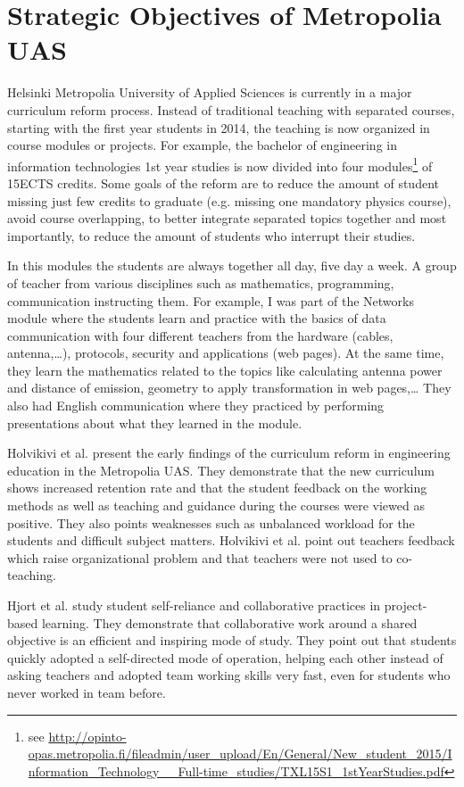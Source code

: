 \section{Strategic Objectives of Metropolia UAS}

Helsinki Metropolia University of Applied Sciences is currently in a major curriculum reform process. 
Instead of traditional teaching with separated courses, starting with the first year students in 2014, the teaching is now organized in course modules or projects. 
For example, the bachelor of engineering in information technologies 1st year studies is now divided into four modules\footnote{see \url{http://opinto-opas.metropolia.fi/fileadmin/user_upload/En/General/New_student_2015/Information_Technology__Full-time_studies/TXL15S1_1stYearStudies.pdf}} of 15ECTS credits. 
Some goals of the reform are to reduce the amount of student missing just few credits to graduate (e.g. missing one mandatory physics course), avoid course overlapping, to better integrate separated topics together and most importantly, to reduce the amount of students who interrupt their studies.

In this modules the students are always together all day, five day a week. A group of teacher from various disciplines such as mathematics, programming, communication instructing them. 
For example, I was part of the Networks module where the students learn and practice with the basics of data communication with four different teachers from the hardware (cables, antenna,\ldots), protocols, security and applications (web pages). 
At the same time, they learn the mathematics related to the topics like calculating antenna power and distance of emission, geometry to apply transformation in web pages,\ldots 
They also had English communication where they practiced by performing presentations about what they learned in the module.

Holvikivi et al. \cite{holvikivi_2015} present the early findings of the curriculum reform in engineering education in the Metropolia UAS. 
They demonstrate that the new curriculum shows increased retention rate and that the student feedback on the working methods as well as teaching and guidance during the courses were viewed as positive. They also points weaknesses such as unbalanced workload for the students and difficult subject matters. Holvikivi et al. point out teachers feedback which raise organizational problem and that teachers were not used to co-teaching.

Hjort et al. \cite{hjort_2015} study student self-reliance and collaborative practices in project-based learning. 
They demonstrate that collaborative work around a shared objective is an efficient and inspiring mode of study.
They point out that students quickly adopted a self-directed mode of operation, helping each other instead of asking teachers and adopted team working skills very fast, even for students who never worked in team before.

  
  
  